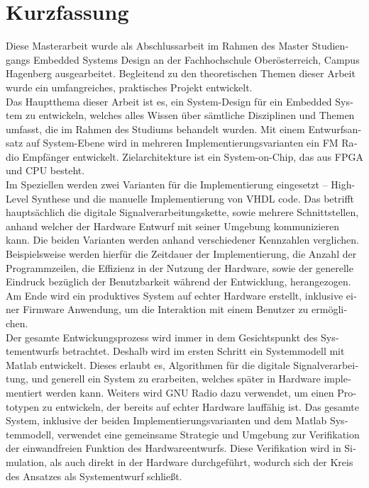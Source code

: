 \chapter{Kurzfassung}

\begin{german}

Diese Masterarbeit wurde als Abschlussarbeit im Rahmen des Master Studiengangs Embedded Systems Design an der Fachhochschule Oberösterreich, Campus Hagenberg ausgearbeitet.
Begleitend zu den theoretischen Themen dieser Arbeit wurde ein umfangreiches, praktisches Projekt entwickelt.\\

Das Hauptthema dieser Arbeit ist es, ein System-Design für ein Embedded System zu entwickeln, welches alles Wissen über sämtliche Disziplinen und Themen umfasst, die im Rahmen des Studiums behandelt wurden.
Mit einem Entwurfsansatz auf System-Ebene wird in mehreren Implementierungsvarianten ein FM Radio Empfänger entwickelt.
Zielarchitekture ist ein System-on-Chip, das aus FPGA und CPU besteht.\\

Im Speziellen werden zwei Varianten für die Implementierung eingesetzt -- High-Level Synthese und die manuelle Implementierung von VHDL code.
Das betrifft hauptsächlich die digitale Signalverarbeitungskette, sowie mehrere Schnittstellen, anhand welcher der Hardware Entwurf mit seiner Umgebung kommunizieren kann.
Die beiden Varianten werden anhand verschiedener Kennzahlen verglichen.
Beispielsweise werden hierfür die Zeitdauer der Implementierung, die Anzahl der Programmzeilen, die Effizienz in der Nutzung der Hardware, sowie der generelle Eindruck bezüglich der Benutzbarkeit während der Entwicklung, herangezogen.
Am Ende wird ein produktives System auf echter Hardware erstellt, inklusive einer Firmware Anwendung, um die Interaktion mit einem Benutzer zu ermöglichen.\\

Der gesamte Entwickungsprozess wird immer in dem Gesichtspunkt des Systementwurfs betrachtet.
Deshalb wird im ersten Schritt ein Systemmodell mit Matlab entwickelt.
Dieses erlaubt es, Algorithmen für die digitale Signalverarbeitung, und generell ein System zu erarbeiten, welches später in Hardware implementiert werden kann.
Weiters wird GNU Radio dazu verwendet, um einen Prototypen zu entwickeln, der bereits auf echter Hardware lauffähig ist.
Das gesamte System, inklusive der beiden Implementierungsvarianten und dem Matlab Systemmodell, verwendet eine gemeinsame Strategie und Umgebung zur Verifikation der einwandfreien Funktion des Hardwareentwurfs.
Diese Verifikation wird in Simulation, als auch direkt in der Hardware durchgeführt, wodurch sich der Kreis des Ansatzes als Systementwurf schließt.

\end{german}
